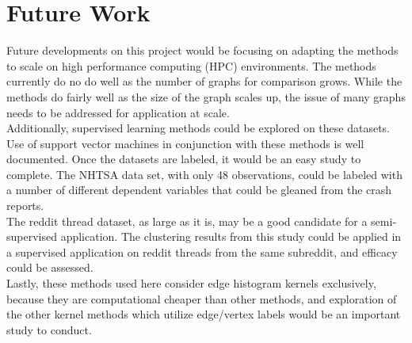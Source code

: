 %
%
%

\chapter{Future Work}

Future developments on this project would be focusing on adapting the methods to scale on high performance computing (HPC) environments. The methods currently do no do well as the number of graphs for comparison grows. While the methods do fairly well as the size of the graph scales up, the issue of many graphs needs to be addressed for application at scale. \\
Additionally, supervised learning methods could be explored on these datasets. Use of support vector machines in conjunction with these methods is well documented. Once the datasets are labeled, it would be an easy study to complete. The NHTSA data set, with only 48 observations, could be labeled with a number of different dependent variables that could be gleaned from the crash reports.\\
The reddit thread dataset, as large as it is, may be a good candidate for a semi-supervised application. The clustering results from this study could be applied in a supervised application on reddit threads from the same subreddit, and efficacy could be assessed. \\
Lastly, these methods used here consider edge histogram kernels exclusively, because they are computational cheaper than other methods, and exploration of the other kernel methods which utilize edge/vertex labels would be an important study to conduct.
